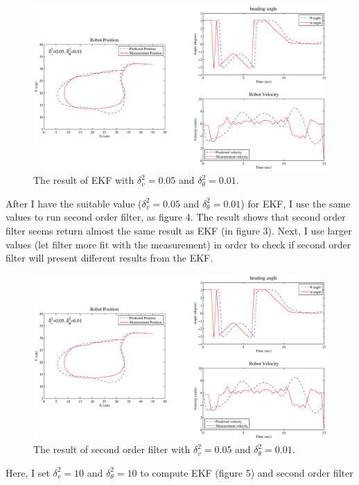 \documentclass{article}
\begin{document}
 \begin{figure}[H]
	 \begin{center}
	 	\includegraphics[width=\textwidth]{EKF_v05_w01.eps}
	 	\caption{The result of EKF with $\delta_v^2=0.05$ and $\delta_\theta^2=0.01$.}
	 \end{center}
 \end{figure}
 After I have the suitable value ($\delta_v^2=0.05$ and $\delta_\theta^2=0.01$) for EKF, I use the same values 
 to run second order filter, as figure 4. The result shows that second order filter seems return almost the same result 
 as EKF (in figure 3). Next, I use larger values (let filter more fit with the measurement) in order to check if second 
 order filter will present different results from the EKF. 
 \begin{figure}[H]
	 \begin{center}
	 	\includegraphics[width=\textwidth]{sof_v05_w01.eps}
	 	\caption{The result of second order filter with $\delta_v^2=0.05$ and $\delta_\theta^2=0.01$.}
	 \end{center}
 \end{figure}
 Here, I set $\delta_v^2=10$ and $\delta_\theta^2=10$ to compute EKF (figure 5) and second order filter 
\end{document}
